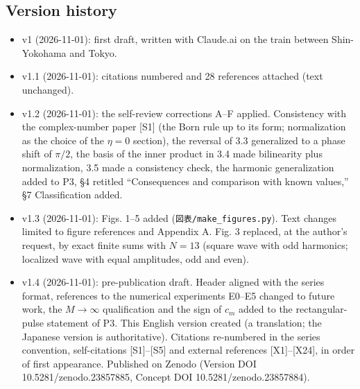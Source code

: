 \documentclass[
  a4paper,
]{article}
\providecommand{\tightlist}{%
  \setlength{\itemsep}{0pt}\setlength{\parskip}{0pt}}
\begin{document}
\subsection{Version history}\label{version-history}

\begin{itemize}
\tightlist
\item
  v1 (2026-11-01): first draft, written with Claude.ai on the train
  between Shin-Yokohama and Tokyo.
\item
  v1.1 (2026-11-01): citations numbered and 28 references attached (text
  unchanged).
\item
  v1.2 (2026-11-01): the self-review corrections A--F applied.
  Consistency with the complex-number paper {[}S1{]} (the Born rule up
  to its form; normalization as the choice of the \(\eta=0\) section),
  the reversal of 3.3 generalized to a phase shift of \(\pi/2\), the
  basis of the inner product in 3.4 made bilinearity plus normalization,
  3.5 made a consistency check, the harmonic generalization added to P3,
  §4 retitled ``Consequences and comparison with known values,'' §7
  Classification added.
\item
  v1.3 (2026-11-01): Figs. 1--5 added (\texttt{図表/\allowbreak{}make\_\allowbreak{}figures.py}).
  Text changes limited to figure references and Appendix A. Fig. 3
  replaced, at the author's request, by exact finite sums with \(N=13\)
  (square wave with odd harmonics; localized wave with equal amplitudes,
  odd and even).
\item
  v1.4 (2026-11-01): pre-publication draft. Header aligned with the
  series format, references to the numerical experiments E0--E5 changed
  to future work, the \(M\to\infty\) qualification and the sign of
  \(c_m\) added to the rectangular-pulse statement of P3. This English
  version created (a translation; the Japanese version is
  authoritative). Citations re-numbered in the series convention,
  self-citations {[}S1{]}--{[}S5{]} and external references
  {[}X1{]}--{[}X24{]}, in order of first appearance. Published on Zenodo
  (Version DOI 10.5281/zenodo.23857885, Concept DOI
  10.5281/zenodo.23857884).
\end{itemize}
\end{document}
